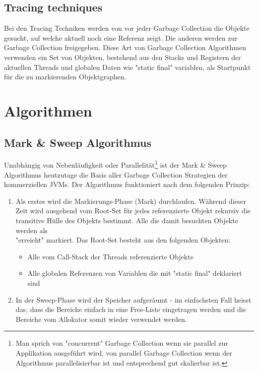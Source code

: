 \subsection{Tracing techniques\cite[S. 77]{lagergren2010oracle}}
Bei den Tracing Techniken werden von vor jeder Garbage Collection die Objekte gesucht, auf welche aktuell noch eine Referenz zeigt. Die anderen werden zur Garbage Collection freigegeben. Diese Art von Garbage Collection Algorithmen verwenden ein Set von Objekten, bestehend aus den Stacks und Registern der aktuellen Threads und globalen Daten wie "static final" variablen, als Startpunkt für die zu markierenden Objektgraphen. 

\section{Algorithmen}
\subsection{Mark \& Sweep Algorithmus\cite{langerkreft201005}}
Unabhängig von Nebenläufigkeit oder Parallelität\footnote{Man sprich von "concurrent" Garbage Collection wenn sie parallel zur Applikation ausgeführt wird, von parallel Garbage Collection wenn der Algorithmus parallelisierbar ist und entsprechend gut skalierbar ist.} ist der Mark \& Sweep Algorithmus heutzutage die Basis aller Garbage Collection Strategien der kommerziellen JVMs. Der Algorithmus funktioniert nach dem folgenden Prinzip:
\begin{enumerate}
	\item Als erstes wird die Markierungs-Phase (Mark) durchlaufen. Während dieser Zeit wird ausgehend vom Root-Set für jedes referenzierte Objekt rekursiv die transitive Hülle des Objekts bestimmt. Alle die damit besuchten Objekte werden als \\"erreicht" markiert. Das Root-Set besteht aus den folgenden Objekten:
	\begin{itemize}
		\item Alle vom Call-Stack der Threads referenzierte Objekte
		\item Alle globalen Referenzen von Variablen die mit "static final" deklariert sind
	\end{itemize}
	\item In der Sweep-Phase wird der Speicher aufgeräumt - im einfachsten Fall heisst das, dass die Bereiche einfach in eine Free-Liste eingetragen werden und die Bereiche vom Allokator somit wieder verwendet werden.
\end{enumerate}

